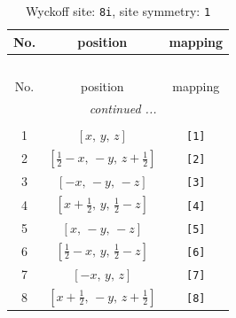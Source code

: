 \documentclass[fleqn,8pt]{jsarticle}
\begin{document}
\renewcommand{\arraystretch}{1.2}
\begin{longtable}{ccc}
\caption{Wyckoff site: {\tt 8i}, site symmetry: {\tt 1}}
 \\
 \hline \hline
No. & position & mapping \\ \hline \endfirsthead

\multicolumn{2}{l}{\tablename\ \thetable{}} \\
 \hline \hline
No. & position & mapping \\ \hline \endhead

 \hline \hline
\multicolumn{2}{r}{\footnotesize\it continued ...} \\ \endfoot

 \hline \hline
\multicolumn{2}{r}{} \\ \endlastfoot

1 & $\left[ x,\, y,\, z \right]$ & {\tt [1]} \\ \hline
2 & $\left[ \frac{1}{2} - x,\, - y,\, z + \frac{1}{2} \right]$ & {\tt [2]} \\ \hline
3 & $\left[ - x,\, - y,\, - z \right]$ & {\tt [3]} \\ \hline
4 & $\left[ x + \frac{1}{2},\, y,\, \frac{1}{2} - z \right]$ & {\tt [4]} \\ \hline
5 & $\left[ x,\, - y,\, - z \right]$ & {\tt [5]} \\ \hline
6 & $\left[ \frac{1}{2} - x,\, y,\, \frac{1}{2} - z \right]$ & {\tt [6]} \\ \hline
7 & $\left[ - x,\, y,\, z \right]$ & {\tt [7]} \\ \hline
8 & $\left[ x + \frac{1}{2},\, - y,\, z + \frac{1}{2} \right]$ & {\tt [8]} \\
\end{longtable}
\end{document}
